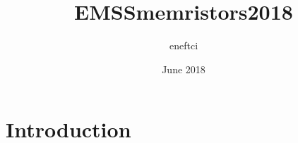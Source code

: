 \documentclass{article}
\title{EMSSmemristors2018}
\author{eneftci }
\date{June 2018}
\begin{document}
\maketitle

\section{Introduction}
\end{document}

